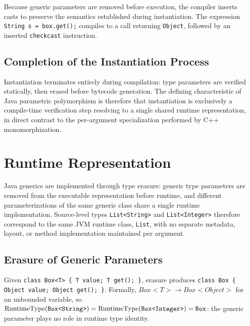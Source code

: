 \documentclass[11pt]{report}
\begin{document}
Because generic parameters are removed before execution, the compiler
inserts casts to preserve the semantics established during instantiation.
The expression \texttt{String s = box.get();} compiles to a call returning
\texttt{Object}, followed by an inserted \texttt{checkcast} instruction.


\subsection{Completion of the Instantiation Process}

Instantiation terminates entirely during compilation: type parameters are
verified statically, then erased before bytecode generation. The defining
characteristic of Java parametric polymorphism is therefore that
instantiation is exclusively a compile-time verification step resolving to
a single shared runtime representation, in direct contrast to the
per-argument specialization performed by C++ monomorphization.


\section{Runtime Representation}
\label{JavaGenerics:RuntimeRepresentation}

Java generics are implemented through type erasure: generic type parameters
are removed from the executable representation before runtime, and
different parameterizations of the same generic class share a single
runtime implementation. Source-level types \texttt{List<String>} and
\texttt{List<Integer>} therefore correspond to the same JVM runtime class,
\texttt{List}, with no separate metadata, layout, or method implementation
maintained per argument.

\subsection{Erasure of Generic Parameters}

Given \texttt{class Box<T> \{ T value; T get(); \}}, erasure produces
\texttt{class Box \{ Object value; Object get(); \}}. Formally,
$Box{<}T{>} \rightarrow Box{<}Object{>}$ for an unbounded variable, so
\newline
$\text{RuntimeType}(\text{\texttt{Box<String>}}) = \text{RuntimeType}(\text{\texttt{Box<Integer>}}) = \text{\texttt{Box}}$: the
generic parameter plays no role in runtime type identity.
\end{document}
